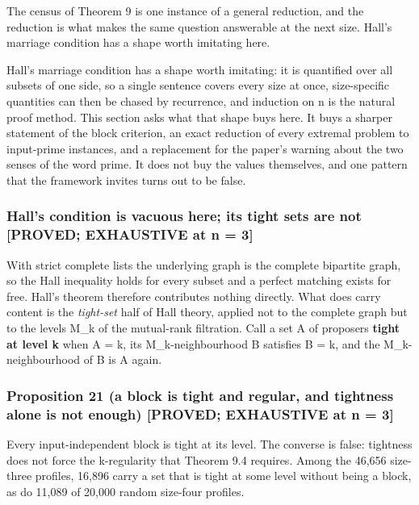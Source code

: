 \documentclass[
  11pt,
]{article}
\begin{document}
The census of Theorem 9 is one instance of a general reduction, and the
reduction is what makes the same question answerable at the next size.
Hall's marriage condition has a shape worth imitating here.

Hall's marriage condition has a shape worth imitating: it is quantified
over all subsets of one side, so a single sentence covers every size at
once, size-specific quantities can then be chased by recurrence, and
induction on n is the natural proof method. This section asks what that
shape buys here. It buys a sharper statement of the block criterion, an
exact reduction of every extremal problem to input-prime instances, and
a replacement for the paper's warning about the two senses of the word
prime. It does not buy the values themselves, and one pattern that the
framework invites turns out to be false.

\hypertarget{halls-condition-is-vacuous-here-its-tight-sets-are-not-proved-exhaustive-at-n-3}{%
\subsubsection{Hall's condition is vacuous here; its tight sets are not
{[}PROVED; EXHAUSTIVE at n =
3{]}}\label{halls-condition-is-vacuous-here-its-tight-sets-are-not-proved-exhaustive-at-n-3}}

With strict complete lists the underlying graph is the complete
bipartite graph, so the Hall inequality holds for every subset and a
perfect matching exists for free. Hall's theorem therefore contributes
nothing directly. What does carry content is the \emph{tight-set} half
of Hall theory, applied not to the complete graph but to the levels M\_k
of the mutual-rank filtration. Call a set A of proposers \textbf{tight
at level k} when \textbar A\textbar{} = k, its M\_k-neighbourhood B
satisfies \textbar B\textbar{} = k, and the M\_k-neighbourhood of B is A
again.

\hypertarget{proposition-21-a-block-is-tight-and-regular-and-tightness-alone-is-not-enough-proved-exhaustive-at-n-3}{%
\subsubsection{Proposition 21 (a block is tight and regular, and
tightness alone is not enough) {[}PROVED; EXHAUSTIVE at n =
3{]}}\label{proposition-21-a-block-is-tight-and-regular-and-tightness-alone-is-not-enough-proved-exhaustive-at-n-3}}

Every input-independent block is tight at its level. The converse is
false: tightness does not force the k-regularity that Theorem 9.4
requires. Among the 46,656 size-three profiles, 16,896 carry a set that
is tight at some level without being a block, as do 11,089 of 20,000
random size-four profiles.
\end{document}
